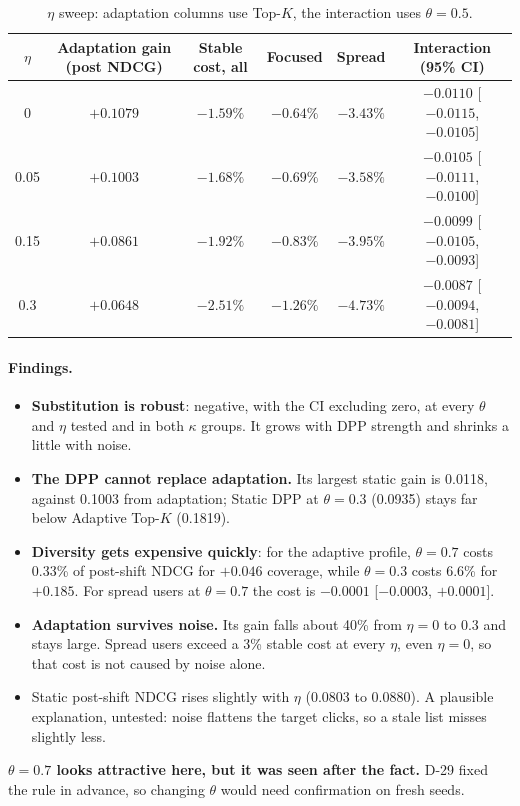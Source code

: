 \documentclass[11pt,a4paper]{article}
\begin{document}
\begin{table}[h]\centering\small
\begin{tabular}{cccccc}
\toprule
$\eta$ & Adaptation gain (post NDCG) & Stable cost, all & Focused & Spread & Interaction (95\% CI) \\
\midrule
0    & $+0.1079$ & $-1.59\%$ & $-0.64\%$ & $-3.43\%$ & $-0.0110$ [$-0.0115$, $-0.0105$] \\
0.05 & $+0.1003$ & $-1.68\%$ & $-0.69\%$ & $-3.58\%$ & $-0.0105$ [$-0.0111$, $-0.0100$] \\
0.15 & $+0.0861$ & $-1.92\%$ & $-0.83\%$ & $-3.95\%$ & $-0.0099$ [$-0.0105$, $-0.0093$] \\
0.3  & $+0.0648$ & $-2.51\%$ & $-1.26\%$ & $-4.73\%$ & $-0.0087$ [$-0.0094$, $-0.0081$] \\
\bottomrule
\end{tabular}
\caption{$\eta$ sweep: adaptation columns use Top-$K$, the interaction uses $\theta=0.5$.}
\end{table}

\paragraph{Findings.}
\begin{itemize}
  \item \textbf{Substitution is robust}: negative, with the CI excluding zero, at every $\theta$
        and $\eta$ tested and in both $\kappa$ groups. It grows with DPP strength and shrinks a
        little with noise.
  \item \textbf{The DPP cannot replace adaptation.} Its largest static gain is 0.0118, against
        0.1003 from adaptation; Static DPP at $\theta=0.3$ (0.0935) stays far below Adaptive
        Top-$K$ (0.1819).
  \item \textbf{Diversity gets expensive quickly}: for the adaptive profile, $\theta=0.7$ costs
        0.33\% of post-shift NDCG for $+0.046$ coverage, while $\theta=0.3$ costs 6.6\% for
        $+0.185$. For spread users at $\theta=0.7$ the cost is $-0.0001$ [$-0.0003$, $+0.0001$].
  \item \textbf{Adaptation survives noise.} Its gain falls about 40\% from $\eta=0$ to $0.3$
        and stays large. Spread users exceed a 3\% stable cost at every $\eta$, even
        $\eta=0$, so that cost is not caused by noise alone.
  \item Static post-shift NDCG rises slightly with $\eta$ (0.0803 to 0.0880). A plausible
        explanation, untested: noise flattens the target clicks, so a stale list misses
        slightly less.
\end{itemize}
\textbf{$\theta=0.7$ looks attractive here, but it was seen after the fact.} D-29 fixed the
rule in advance, so changing $\theta$ would need confirmation on fresh seeds.
\end{document}
